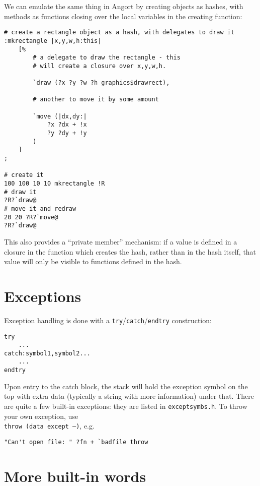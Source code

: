 We can emulate the same thing in Angort by creating objects as
hashes, with methods as functions closing over the local variables
in the creating function:

\begin{lstlisting}
# create a rectangle object as a hash, with delegates to draw it
:mkrectangle |x,y,w,h:this|
    [%
        # a delegate to draw the rectangle - this
        # will create a closure over x,y,w,h.
        
        `draw (?x ?y ?w ?h graphics$drawrect),
        
        # another to move it by some amount
        
        `move (|dx,dy:| 
            ?x ?dx + !x
            ?y ?dy + !y
        )
    ]
;   

# create it
100 100 10 10 mkrectangle !R
# draw it
?R?`draw@
# move it and redraw
20 20 ?R?`move@
?R?`draw@
\end{lstlisting}
This also provides a ``private member'' mechanism: if a value is defined
in a closure in the function which creates the hash, rather than in
the hash itself, that value will only be visible to functions defined
in the hash.


\section{Exceptions}
Exception handling is done with a \texttt{try}/\texttt{catch}/\texttt{endtry} 
construction:
\begin{lstlisting}
try
    ...
catch:symbol1,symbol2...
    ...
endtry
\end{lstlisting}
Upon entry to the catch block, the stack will hold the exception symbol
on the top with extra data (typically a string with more information)
under that. There are quite a few built-in exceptions: they are listed
in \texttt{exceptsymbs.h}. To throw your own exception, use \\
\texttt{throw (data except --)}, e.g.
\begin{lstlisting}
"Can't open file: " ?fn + `badfile throw 
\end{lstlisting}


\section{More built-in words}


